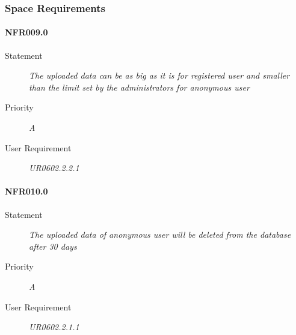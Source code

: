 \subsubsection{Space Requirements}

\paragraph{NFR009.0}
\begin{description}
\item[Statement] \textit{
The uploaded data can be as big as it is for registered user and smaller than the limit set by the administrators for anonymous user
}
\item[Priority] \textit{A}
\item[User Requirement] \textit{UR0602.2.2.1}
\end{description}

\paragraph{NFR010.0}
\begin{description}
\item[Statement] \textit{
The uploaded data of anonymous user will be deleted from the database after 30 days
}
\item[Priority] \textit{A}
\item[User Requirement] \textit{UR0602.2.1.1}
\end{description}


